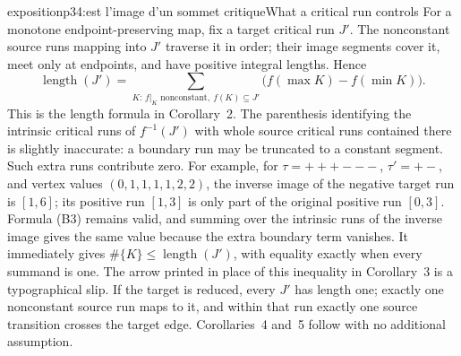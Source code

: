 \begin{dcomment}{exposition}{p34:est l'image d'un sommet critique}{What a critical run controls}
For a monotone endpoint-preserving map, fix a target critical run $J'$. The nonconstant source runs mapping into $J'$ traverse it in order; their image segments cover it, meet only at endpoints, and have positive integral lengths. Hence
\[
 \operatorname{length}(J')
 =\sum_{K:\,f|_K\text{ nonconstant},\ f(K)\subseteq J'}
       \bigl(f(\max K)-f(\min K)\bigr).           \tag{B3}
\]
This is the length formula in Corollary~2. The parenthesis identifying the intrinsic critical runs of $f^{-1}(J')$ with whole source critical runs contained there is slightly inaccurate: a boundary run may be truncated to a constant segment. Such extra runs contribute zero. For example, for $\tau=+++---$, $\tau'=+-$, and vertex values $(0,1,1,1,1,2,2)$, the inverse image of the negative target run is $[1,6]$; its positive run $[1,3]$ is only part of the original positive run $[0,3]$. Formula (B3) remains valid, and summing over the intrinsic runs of the inverse image gives the same value because the extra boundary term vanishes. It immediately gives
$\#\{K\}\leq\operatorname{length}(J')$, with equality exactly when every summand is one. The arrow printed in place of this inequality in Corollary~3 is a typographical slip. If the target is reduced, every $J'$ has length one; exactly one nonconstant source run maps to it, and within that run exactly one source transition crosses the target edge. Corollaries~4 and~5 follow with no additional assumption.
\end{dcomment}

